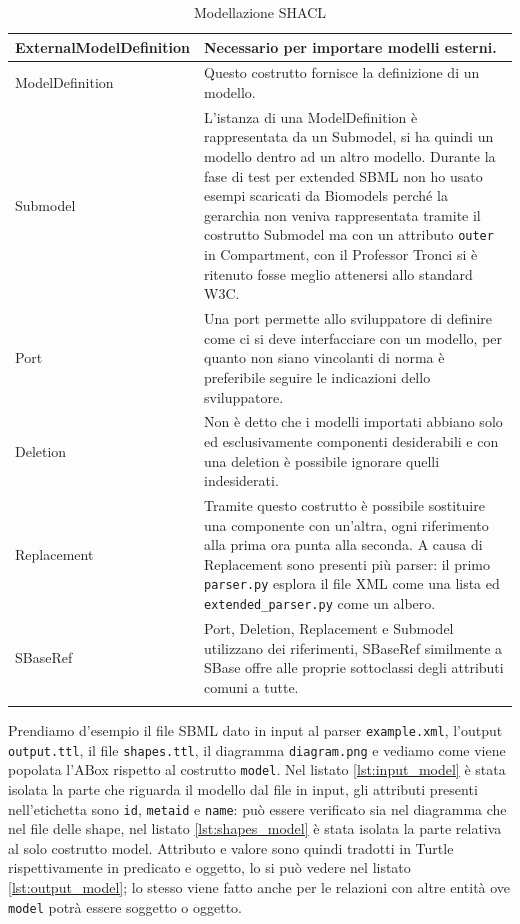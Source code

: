 \documentclass{article}
\begin{document}
\begin{longtable}{p{}p{}}
    \hline
    ExternalModelDefinition &  Necessario per importare modelli esterni. \\
    \hline
    ModelDefinition & Questo costrutto fornisce la definizione di un modello. \\ 
    \hline
    Submodel & L'istanza di una ModelDefinition è rappresentata da un Submodel, si ha quindi un modello dentro ad un altro modello. Durante la fase di test per extended SBML non ho usato esempi scaricati da Biomodels perché la gerarchia non veniva rappresentata tramite il costrutto Submodel ma con un attributo \texttt{outer} in Compartment, con il Professor Tronci si è ritenuto fosse meglio attenersi allo standard W3C. \\ 
    \hline
    Port & Una port permette allo sviluppatore di definire come ci si deve interfacciare con un modello, per quanto non siano vincolanti di norma è preferibile seguire le indicazioni dello sviluppatore. \\ 
    \hline
    Deletion & Non è detto che i modelli importati abbiano solo ed esclusivamente componenti desiderabili e con una deletion è possibile ignorare quelli indesiderati. \\
    \hline
    Replacement & Tramite questo costrutto è possibile sostituire una componente con un'altra, ogni riferimento alla prima ora punta alla seconda. A causa di Replacement sono presenti più parser: il primo \texttt{parser.py} esplora il file XML come una lista ed \texttt{extended\_parser.py} come un albero. \\
    \hline
    SBaseRef & Port, Deletion, Replacement e Submodel utilizzano dei riferimenti, SBaseRef similmente a SBase offre alle proprie sottoclassi degli attributi comuni a tutte. \\
    \hline

    \caption{Modellazione SHACL}
    \label{tab:modellazione}
\end{longtable}

Prendiamo d'esempio il file SBML dato in input al parser \texttt{example.xml}, l'output \texttt{output.ttl}, il file \texttt{shapes.ttl}, il diagramma \texttt{diagram.png} e vediamo come viene popolata l'ABox rispetto al costrutto \texttt{model}. Nel listato \ref{lst:input_model} è stata isolata la parte che riguarda il modello dal file in input, gli attributi presenti nell'etichetta sono \texttt{id}, \texttt{metaid} e \texttt{name}: può essere verificato sia nel diagramma che nel file delle shape, nel listato \ref{lst:shapes_model} è stata isolata la parte relativa al solo costrutto model. Attributo e valore sono quindi tradotti in Turtle rispettivamente in predicato e oggetto, lo si può vedere nel listato \ref{lst:output_model}; lo stesso viene fatto anche per le relazioni con altre entità ove \texttt{model} potrà essere soggetto o oggetto. 
\end{document}
